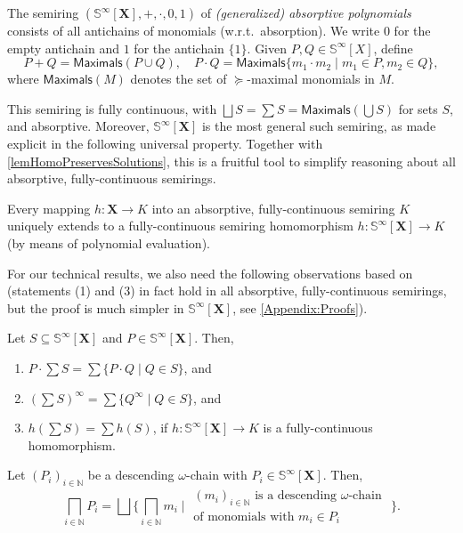 \documentclass[english,runningheads,a4paper,envcountsame]{llncs}
\newenvironment{Definition}{\definition\upshape}{\enddefinition}
\newcommand{\Inf}{\bigsqcap}
\newcommand{\Sup}{\bigsqcup}
\newcommand{\Nat}{\mathbb{N}}
\newcommand{\Sinf}{{\mathbb S}^{\infty}}
\newcommand*{\XX}{{\bm X}}
\newcommand*{\Max}{\mathsf{Maximals}}
\newcommand*{\absorbs}{\succeq}
\newcommand*{\co}{\colon}
\newcommand{\Bigmid}{\;\Big|\;}
\begin{document}
\begin{Definition}
The semiring $(\Sinf[\XX], +, \cdot, 0, 1)$ of \emph{(generalized) absorptive polynomials} consists of all antichains of monomials (w.r.t.\ absorption). We write $0$ for the empty antichain and $1$ for the antichain $\{1\}$.
Given $P,Q \in \Sinf[X]$, define
\[
    P + Q = \Max(P \cup Q),
    \quad
    P \cdot Q = \Max\{ m_1 \cdot m_2 \mid m_1 \in P, m_2 \in Q \},
\]
where $\Max(M)$ denotes the set of $\absorbs$-maximal monomials in $M$.
\end{Definition}

This semiring is fully continuous, with $\Sup S = \sum S = \Max(\bigcup S)$ for sets $S$, and absorptive.
Moreover, $\Sinf[\XX]$ is the most general such semiring, as made explicit in the following universal property.
Together with \cref{lemHomoPreservesSolutions}, this is a fruitful tool to simplify reasoning about all absorptive, fully-continuous semirings.

\begin{theorem}\label{thmSinfUniversal}
Every mapping $h \co \XX \to K$ into an absorptive, fully-continuous semiring $K$
uniquely extends to a fully-continuous semiring homomorphism $h \co \Sinf[\XX] \to K$
(by means of polynomial evaluation).
\end{theorem}

For our technical results, we also need the following observations based on \cite{DannertGraNaaTan19}
(statements (1) and (3) in fact hold in all absorptive, fully-continuous semirings, but the proof is much simpler in $\Sinf[\XX]$, see \cref{Appendix:Proofs}).

\begin{lemma}\label{lemSinfExtra}
Let $S \subseteq \Sinf[\XX]$ and $P \in \Sinf[\XX]$. Then,
\begin{enumerate}
\item $P \cdot \sum S = \sum \{P \cdot Q \mid Q \in S\}$, and
\item $(\sum S)^\infty = \sum \{Q^\infty \mid Q \in S\}$, and
\item $h(\sum S) = \sum h(S)$, if $h \co \Sinf[\XX] \to K$ is a fully-continuous homomorphism.
\end{enumerate}
\end{lemma}

\begin{lemma}\label{lemSinfInfima}
Let $(P_i)_{i \in \Nat}$ be a descending $\omega$-chain with $P_i \in \Sinf[\XX]$.
Then,
\[
    \Inf_{i \in \Nat} P_i = \Sup \Big\{ \Inf_{i \in \Nat} m_i \Bigmid
    \begin{array}{l}
        \text{$(m_i)_{i \in \Nat}$ is a descending $\omega$-chain } \\
        \text{of monomials with $m_i \in P_i$}
    \end{array}
    \Big\}.
\]
\end{lemma}
\end{document}

